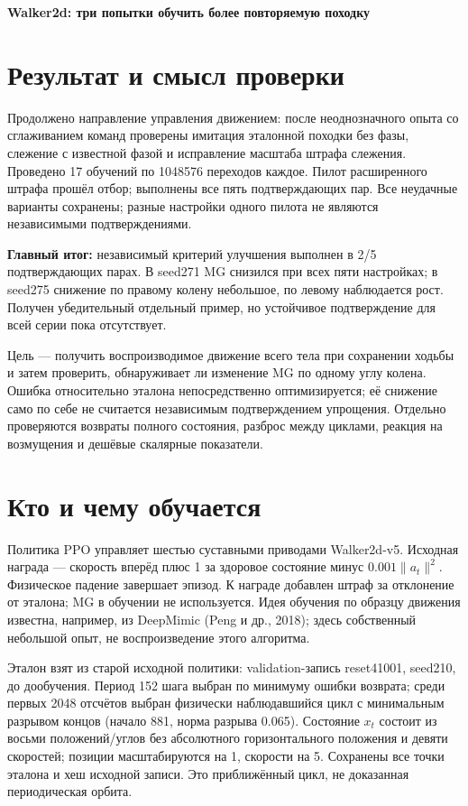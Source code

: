 \documentclass[10pt,a4paper]{article}
\begin{document}
{\Large\bfseries Walker2d: три попытки обучить более повторяемую походку}\par\medskip

\section*{Результат и смысл проверки}

Продолжено направление управления движением: после неоднозначного опыта со сглаживанием команд проверены имитация эталонной походки без фазы, слежение с известной фазой и исправление масштаба штрафа слежения. Проведено 17 обучений по 1048576 переходов каждое. Пилот расширенного штрафа прошёл отбор; выполнены все пять подтверждающих пар. Все неудачные варианты сохранены; разные настройки одного пилота не являются независимыми подтверждениями.

\textbf{Главный итог:} независимый критерий улучшения выполнен в 2/5 подтверждающих парах. В seed271 MG снизился при всех пяти настройках; в seed275 снижение по правому колену небольшое, по левому наблюдается рост. Получен убедительный отдельный пример, но устойчивое подтверждение для всей серии пока отсутствует.

Цель --- получить воспроизводимое движение всего тела при сохранении ходьбы и затем проверить, обнаруживает ли изменение MG по одному углу колена. Ошибка относительно эталона непосредственно оптимизируется; её снижение само по себе не считается независимым подтверждением упрощения. Отдельно проверяются возвраты полного состояния, разброс между циклами, реакция на возмущения и дешёвые скалярные показатели.

\section*{Кто и чему обучается}

Политика PPO управляет шестью суставными приводами Walker2d-v5. Исходная награда --- скорость вперёд плюс 1 за здоровое состояние минус $0.001\|a_t\|^2$. Физическое падение завершает эпизод. К награде добавлен штраф за отклонение от эталона; MG в обучении не используется. Идея обучения по образцу движения известна, например, из DeepMimic (Peng и др., 2018); здесь собственный небольшой опыт, не воспроизведение этого алгоритма.

Эталон взят из старой исходной политики: validation-запись reset41001, seed210, до дообучения. Период 152 шага выбран по минимуму ошибки возврата; среди первых 2048 отсчётов выбран физически наблюдавшийся цикл с минимальным разрывом концов (начало 881, норма разрыва 0.065). Состояние $x_t$ состоит из восьми положений/углов без абсолютного горизонтального положения и девяти скоростей; позиции масштабируются на 1, скорости на 5. Сохранены все точки эталона и хеш исходной записи. Это приближённый цикл, не доказанная периодическая орбита.
\end{document}
